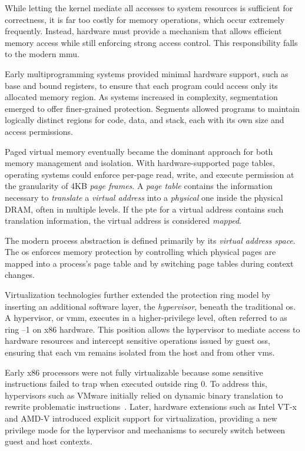 
While letting the kernel mediate all accesses to system resources is sufficient for correctness, it is far too costly for memory operations, which occur extremely frequently.
Instead, hardware must provide a mechanism that allows efficient memory access while still enforcing strong access control.
This responsibility falls to the modern \gls{mmu}.

Early multiprogramming systems provided minimal hardware support, such as base and bound registers, to ensure that each program could access only its allocated memory region.
As systems increased in complexity, segmentation emerged to offer finer-grained protection.
Segments allowed programs to maintain logically distinct regions for code, data, and stack, each with its own size and access permissions.

Paged virtual memory eventually became the dominant approach for both memory management and isolation.
With hardware-supported page tables, operating systems could enforce per-page read, write, and execute permission at the granularity of 4KB \emph{page frames}.
A \emph{page table} contains the information necessary to \emph{translate} a \emph{virtual address} into a \emph{physical} one inside the physical DRAM, often in multiple levels.
If the \gls{pte} for a virtual address contains such translation information, the virtual address is considered \emph{mapped}.

The modern process abstraction is defined primarily by its \emph{virtual address space}.
The \gls{os} enforces memory protection by controlling which physical pages are mapped into a process's page table and by switching page tables during context changes.


Virtualization technologies further extended the protection ring model by inserting an additional software layer, the \emph{hypervisor}, beneath the traditional \gls{os}.
A hypervisor, or \gls{vmm}, executes in a higher-privilege level, often referred to as ring –1 on x86 hardware.
This position allows the hypervisor to mediate access to hardware resources and intercept sensitive operations issued by guest \glspl{os}, ensuring that each \gls{vm} remains isolated from the host and from other \glspl{vm}.

Early x86 processors were not fully virtualizable because some sensitive instructions failed to trap when executed outside ring 0.
To address this, hypervisors such as VMware initially relied on dynamic binary translation to rewrite problematic instructions~\cite{devine2002virtualization}.
Later, hardware extensions such as Intel VT-x~\cite{uhlig2005intel} and AMD-V introduced explicit support for virtualization, providing a new privilege mode for the hypervisor and mechanisms to securely switch between guest and host contexts.

